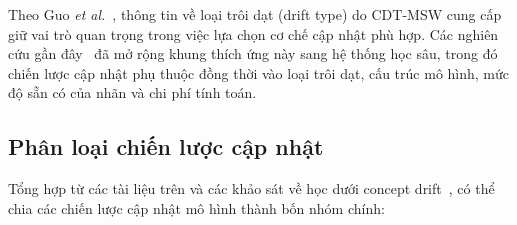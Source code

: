 Theo Guo \textit{et al.}~\cite{guo2022cdtmsw}, thông tin về loại trôi dạt (drift type) do CDT-MSW cung cấp giữ vai trò quan trọng trong việc lựa chọn cơ chế cập nhật phù hợp. Các nghiên cứu gần đây~\cite{jourdan2023process} đã mở rộng khung thích ứng này sang hệ thống học sâu, trong đó chiến lược cập nhật phụ thuộc đồng thời vào loại trôi dạt, cấu trúc mô hình, mức độ sẵn có của nhãn và chi phí tính toán.

\subsection{Phân loại chiến lược cập nhật}
Tổng hợp từ các tài liệu trên và các khảo sát về học dưới concept drift~\cite{gama2014survey, lu2018learning, celik2020adaptation}, có thể chia các chiến lược cập nhật mô hình thành bốn nhóm chính:

